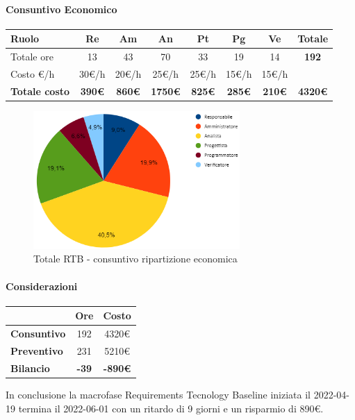 \paragraph{Consuntivo Economico}
\begin{center}
	\renewcommand{\arraystretch}{1.8}
	\begin{tabular}{ |m{6em}|c|c|c|c|c|c|c| }
	\hline
	\textbf{Ruolo} & \textbf{Re} & \textbf{Am} &  \textbf{An} &  \textbf{Pt} &  \textbf{Pg} &  \textbf{Ve} &  \textbf{Totale}\\
    \hline
    Totale ore & 13 & 43 & 70 & 33 & 19 & 14 & \textbf{192}\\
    \hline
    Costo \euro/h & 30\euro/h & 20\euro/h & 25\euro/h & 25\euro/h & 15\euro/h & 15\euro/h & \\
    \hline
    \textbf{Totale costo} & \textbf{390\euro} & \textbf{860\euro} &  \textbf{1750\euro} &  \textbf{825\euro} &  \textbf{285\euro} &  \textbf{210\euro} &  \textbf{4320\euro}\\
    \hline
	\end{tabular}

    \begin{figure}[H]
        \centering\includegraphics[width=0.7\textwidth, height=0.7\textheight, keepaspectratio]{images/consuntivo/RTB-costo.png}
        \caption{Totale RTB - consuntivo ripartizione economica}
    \end{figure}
\end{center}

\paragraph{Considerazioni} \hfill \break
\begin{center}
	\renewcommand{\arraystretch}{1.8}
	\begin{tabular}{ | l |c|c| }
    \hline
    & \textbf{Ore} & \textbf{Costo} \\
	\hline
    \textbf{Consuntivo} & 192 & 4320\euro \\
    \hline
    \textbf{Preventivo} & 231 & 5210\euro \\
    \hline
    \textbf{Bilancio} & \textbf{-39} & \textbf{-890\euro} \\
    \hline
    \end{tabular}
\end{center}
In conclusione la macrofase Requirements Tecnology Baseline iniziata il 2022-04-19 termina il 2022-06-01 con un ritardo di 9 giorni e un risparmio di 890\euro.

